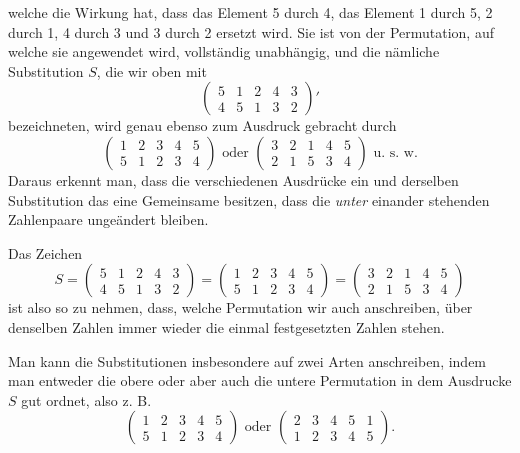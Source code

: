 \documentclass[11pt]{article}
\providecommand{\weberpage}[1]{}
\begin{document}
\weberpage{4}

welche die Wirkung hat, dass das Element 5 durch 4, das Element 1 durch 5, 2 durch 1, 4 durch 3 und 3 durch 2 ersetzt wird. Sie ist von der Permutation, auf welche sie angewendet wird, vollständig unabhängig, und die nämliche Substitution $S$, die wir oben mit
\[
\begin{pmatrix} 5 & 1 & 2 & 4 & 3\\ 4 & 5 & 1 & 3 & 2 \end{pmatrix}'
\]
bezeichneten, wird genau ebenso zum Ausdruck gebracht durch
\[
\begin{pmatrix} 1 & 2 & 3 & 4 & 5\\ 5 & 1 & 2 & 3 & 4 \end{pmatrix} \text{ oder } \begin{pmatrix} 3 & 2 & 1 & 4 & 5\\ 2 & 1 & 5 & 3 & 4 \end{pmatrix} \text{ u. s. w.}
\]
Daraus erkennt man, dass die verschiedenen Ausdrücke ein und derselben Substitution das eine Gemeinsame besitzen, dass die \textit{unter} einander stehenden Zahlenpaare ungeändert bleiben.

Das Zeichen
\[
S = \begin{pmatrix} 5 & 1 & 2 & 4 & 3\\ 4 & 5 & 1 & 3 & 2 \end{pmatrix} = \begin{pmatrix} 1 & 2 & 3 & 4 & 5\\ 5 & 1 & 2 & 3 & 4 \end{pmatrix} = \begin{pmatrix} 3 & 2 & 1 & 4 & 5\\ 2 & 1 & 5 & 3 & 4 \end{pmatrix}
\]
ist also so zu nehmen, dass, welche Permutation wir auch anschreiben, über denselben Zahlen immer wieder die einmal festgesetzten Zahlen stehen.

Man kann die Substitutionen insbesondere auf zwei Arten anschreiben, indem man entweder die obere oder aber auch die untere Permutation in dem Ausdrucke $S$ gut ordnet, also z. B.
\[
\begin{pmatrix} 1 & 2 & 3 & 4 & 5\\ 5 & 1 & 2 & 3 & 4 \end{pmatrix} \text{ oder } \begin{pmatrix} 2 & 3 & 4 & 5 & 1\\ 1 & 2 & 3 & 4 & 5 \end{pmatrix}.
\]
\end{document}
